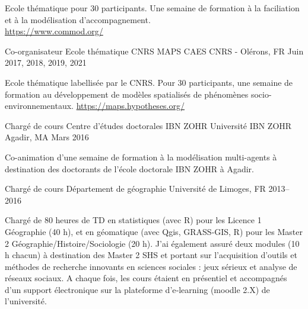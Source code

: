 \begin{cventries}
{\begin{cvitems}
        Ecole thématique pour 30 participants. Une semaine de formation à la faciliation et à la modélisation d'accompagnement.\\
        \url{https://www.commod.org/}
      \end{cvitems}
      }
  \cventry
    {Co-organisateur} %
    {Ecole thématique CNRS MAPS} %
    {CAES CNRS - Olérons, FR} %
    {Juin 2017, 2018, 2019, 2021} %
    {
      \begin{cvitems} %
        Ecole thématique labellisée par le CNRS. Pour 30 participants, une semaine de formation au développement de modèles spatialisés de phénomènes socio-environnementaux. \url{https://maps.hypotheses.org/}
        \end{cvitems}
    }

\cventry
  {Chargé de cours} %
  {Centre d'études doctorales IBN ZOHR} %
  {Université IBN ZOHR Agadir, MA} %
  {Mars 2016} %
  {
    \begin{cvitems} %
      Co-animation d'une semaine de formation à la modélisation multi-agents à destination des doctorants de l'école doctorale IBN ZOHR à Agadir.
    \end{cvitems}
  }


\cventry
  {Chargé de cours} %
  {Département de géographie} %
  {Université de Limoges, FR} %
  {2013--2016} %
  {
    \begin{cvitems} %
    Chargé de 80 heures de TD en statistiques (avec R) pour les Licence 1 Géographie (40 h), et en géomatique (avec Qgis, GRASS‑GIS, R) pour les Master 2 Géographie/Histoire/Sociologie (20 h). J’ai également assuré deux modules (10 h chacun) à destination des Master 2 SHS et portant sur l’acquisition d’outils et méthodes de recherche innovants en sciences sociales : jeux sérieux et analyse de réseaux sociaux. A chaque fois, les cours étaient en présentiel et accompagnés d’un support électronique sur la plateforme d’e‑learning (moodle 2.X) de l’université.
    \end{cvitems}
  }


\end{cventries}
